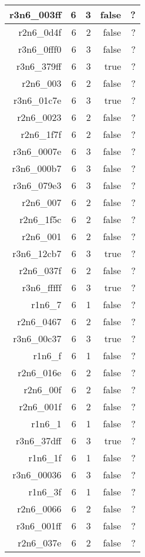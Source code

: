 \begin{center}
\begin{longtable}{rrrrr}
  r3n6\_003ff & 6 & 3 & false & ? \\ \hline
  r2n6\_0d4f & 6 & 2 & false & ? \\ \hline
  r3n6\_0fff0 & 6 & 3 & false & ? \\ \hline
  r3n6\_379ff & 6 & 3 & true & ? \\ \hline
  r2n6\_003 & 6 & 2 & false & ? \\ \hline
  r3n6\_01c7e & 6 & 3 & true & ? \\ \hline
  r2n6\_0023 & 6 & 2 & false & ? \\ \hline
  r2n6\_1f7f & 6 & 2 & false & ? \\ \hline
  r3n6\_0007e & 6 & 3 & false & ? \\ \hline
  r3n6\_000b7 & 6 & 3 & false & ? \\ \hline
  r3n6\_079e3 & 6 & 3 & false & ? \\ \hline
  r2n6\_007 & 6 & 2 & false & ? \\ \hline
  r2n6\_1f5c & 6 & 2 & false & ? \\ \hline
  r2n6\_001 & 6 & 2 & false & ? \\ \hline
  r3n6\_12cb7 & 6 & 3 & true & ? \\ \hline
  r2n6\_037f & 6 & 2 & false & ? \\ \hline
  r3n6\_fffff & 6 & 3 & true & ? \\ \hline
  r1n6\_7 & 6 & 1 & false & ? \\ \hline
  r2n6\_0467 & 6 & 2 & false & ? \\ \hline
  r3n6\_00c37 & 6 & 3 & true & ? \\ \hline
  r1n6\_f & 6 & 1 & false & ? \\ \hline
  r2n6\_016e & 6 & 2 & false & ? \\ \hline
  r2n6\_00f & 6 & 2 & false & ? \\ \hline
  r2n6\_001f & 6 & 2 & false & ? \\ \hline
  r1n6\_1 & 6 & 1 & false & ? \\ \hline
  r3n6\_37dff & 6 & 3 & true & ? \\ \hline
  r1n6\_1f & 6 & 1 & false & ? \\ \hline
  r3n6\_00036 & 6 & 3 & false & ? \\ \hline
  r1n6\_3f & 6 & 1 & false & ? \\ \hline
  r2n6\_0066 & 6 & 2 & false & ? \\ \hline
  r3n6\_001ff & 6 & 3 & false & ? \\ \hline
  r2n6\_037e & 6 & 2 & false & ? \\ \hline

\end{longtable}
\end{center}

